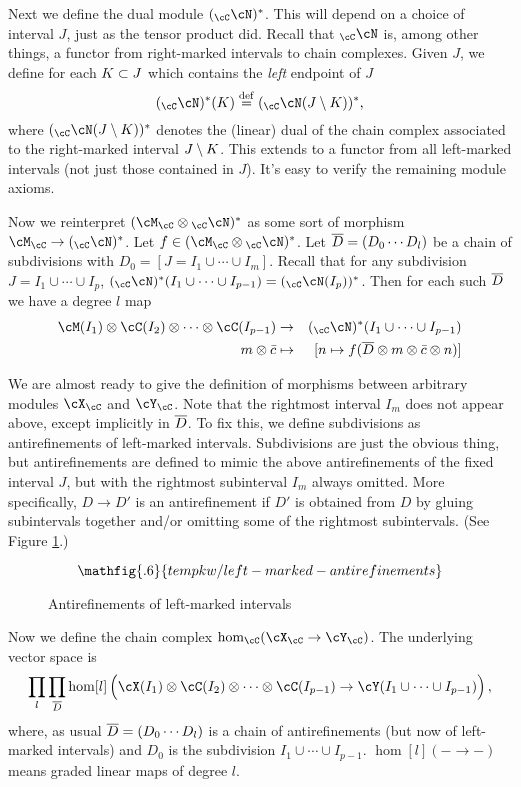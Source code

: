 Next we define the dual module $(_\cC\cN)^*$.
This will depend on a choice of interval $J$, just as the tensor product did.
Recall that $_\cC\cN$ is, among other things, a functor from right-marked intervals
to chain complexes.
Given $J$, we define for each $K\subset J$ which contains the {\it left} endpoint of $J$
\[
	(_\cC\cN)^*(K) \deq ({_\cC\cN}(J\setmin K))^* ,
\]
where $({_\cC\cN}(J\setmin K))^*$ denotes the (linear) dual of the chain complex associated
to the right-marked interval $J\setminus K$.
This extends to a functor from all left-marked intervals (not just those contained in $J$).
It's easy to verify the remaining module axioms.

Now we reinterpret $(\cM_\cC\ot {_\cC\cN})^*$
as some sort of morphism $\cM_\cC \to (_\cC\cN)^*$.
Let $f\in (\cM_\cC\ot {_\cC\cN})^*$.
Let ${\overline D} = (D_0\cdots D_l)$ be a chain of subdivisions with $D_0 = [J = I_1\cup\cdots\cup I_m]$.
Recall that for any subdivision $J = I_1\cup\cdots\cup I_p$, $(_\cC\cN)^*(I_1\cup\cdots\cup I_{p-1}) = (_\cC\cN(I_p))^*$.
Then for each such ${\overline D}$ we have a degree $l$ map
\begin{eqnarray*}
	\cM(I_1)\ot\cC(I_2)\ot\cdots\ot\cC(I_{p-1}) &\to& (_\cC\cN)^*(I_1\cup\cdots\cup I_{p-1}) \\
	m\ot \cbar &\mapsto& [n\mapsto f(\olD\ot m\ot \cbar\ot n)]
\end{eqnarray*}

We are almost ready to give the definition of morphisms between arbitrary modules
$\cX_\cC$ and $\cY_\cC$.
Note that the rightmost interval $I_m$ does not appear above, except implicitly in ${\overline D}$.
To fix this, we define subdivisions as antirefinements of left-marked intervals.
Subdivisions are just the obvious thing, but antirefinements are defined to mimic
the above antirefinements of the fixed interval $J$, but with the rightmost subinterval $I_m$ always
omitted.
More specifically, $D\to D'$ is an antirefinement if $D'$ is obtained from $D$ by 
gluing subintervals together and/or omitting some of the rightmost subintervals.
(See Figure \ref{fig:lmar}.)
\begin{figure}[t]\begin{equation*}
\mathfig{.6}{tempkw/left-marked-antirefinements}
\end{equation*}\caption{Antirefinements of left-marked intervals}\label{fig:lmar}\end{figure}

Now we define the chain complex $\hom_\cC(\cX_\cC \to \cY_\cC)$.
The underlying vector space is 
\[
	\prod_l \prod_{\olD} \hom[l]\left(
				\cX(I_1)\ot\cC(I_2)\ot\cdots\ot\cC(I_{p-1}) \to 
							\cY(I_1\cup\cdots\cup I_{p-1}) \rule{0pt}{1.1em}\right) ,
\]
where, as usual ${\overline D} = (D_0\cdots D_l)$ is a chain of antirefinements
(but now of left-marked intervals) and $D_0$ is the subdivision $I_1\cup\cdots\cup I_{p-1}$.
$\hom[l](- \to -)$ means graded linear maps of degree $l$.

